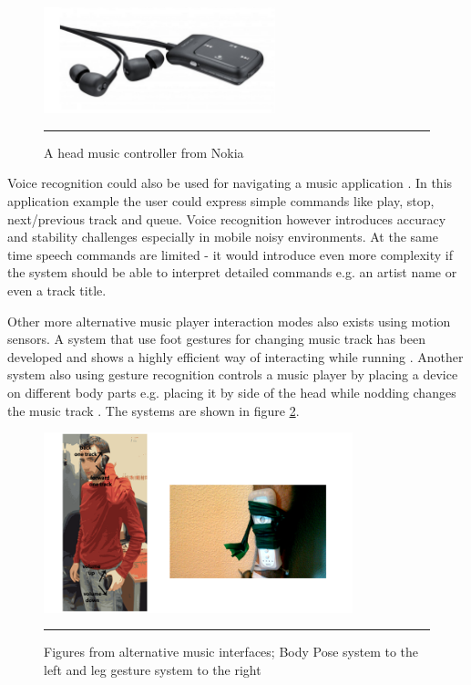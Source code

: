 \begin{figure}[htbp]
	\centering
		\includegraphics[width=0.6\textwidth,height=\textheight,keepaspectratio]{./Figures/nokia-headset.png}
		\rule{35em}{0.5pt}
	\caption[Nokia music headset]{A head music controller from Nokia \cite{nokia_launch:_2011}}
	\label{fig:nokia}
\end{figure}

Voice recognition could also be used for navigating a music application \cite{stewart_boling_voice_2013}. In this application example the user could express simple commands like play, stop, next/previous track and queue. Voice recognition however introduces accuracy and stability challenges especially in mobile noisy environments. At the same time speech commands are limited - it would introduce even more complexity if the system should be able to interpret detailed commands e.g. an artist name or even a track title.

Other more alternative music player interaction modes also exists using motion sensors. A system that use foot gestures for changing music track has been developed and shows a highly efficient way of interacting while running \cite{smus_running_2010}. Another system also using gesture recognition controls a music player by placing a device on different body parts e.g. placing it by side of the head while nodding changes the music track \cite{strachan_bodyspace_2007}. The systems are shown in figure \ref{fig:bodyandleg}.

\begin{figure}[htbp]
	\centering
		\includegraphics[width=0.8\textwidth,height=\textheight,keepaspectratio]{./Figures/bodyposeandleg.png}
		\rule{35em}{0.5pt}
	\caption[Alternative music players]{Figures from alternative music interfaces; Body Pose system \cite{strachan_bodyspace_2007} to the left and leg gesture system \cite{smus_running_2010} to the right}
	\label{fig:bodyandleg}
\end{figure}

